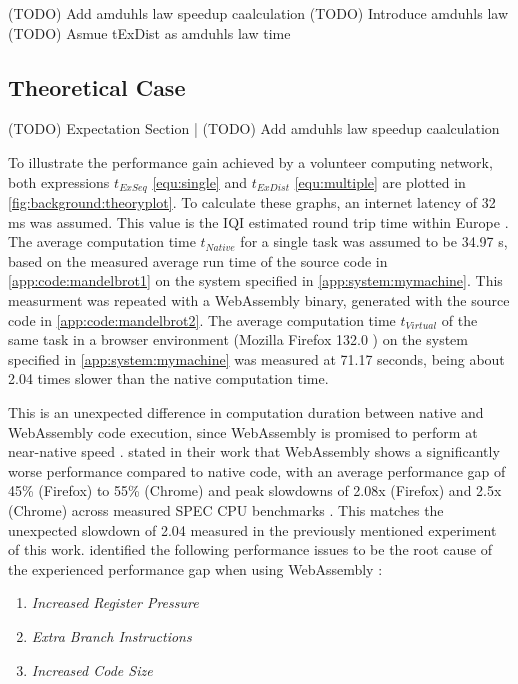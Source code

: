 (TODO) Add amduhls law speedup caalculation
(TODO) Introduce amduhls law
(TODO) Asmue tExDist as amduhls law time 

\subsection{Theoretical Case}
\label{subsec:concept:theroy_example}
(TODO) Expectation Section | (TODO) Add amduhls law speedup caalculation

To illustrate the performance gain achieved by a volunteer computing network, both expressions $t_{ExSeq}$ \eqref{equ:single} and $t_{ExDist}$ \eqref{equ:multiple} are plotted in \autoref{fig:background:theoryplot}. To calculate these graphs, an internet latency of 32 ms \cite{backend:latency} was assumed. This value is the \ac{IQI} estimated round trip time within Europe \cite{backend:latency}. The average computation time $t_{Native}$ for a single task was assumed to be 34.97 s, based on the measured average run time of the source code in \autoref{app:code:mandelbrot1} on the system specified in \autoref{app:system:mymachine}. This measurment was repeated with a WebAssembly binary, generated with the source code in \autoref{app:code:mandelbrot2}. The average computation time $t_{Virtual}$ of the same task in a browser environment (Mozilla Firefox 132.0 \cite{background:firefox}) on the system specified in \autoref{app:system:mymachine} was measured at 71.17 seconds, being about 2.04 times slower than the native computation time.
\newline
\begin{addmargin}[25pt]{25pt}
  This is an unexpected difference in computation duration between native and WebAssembly code execution, since WebAssembly is promised to perform at near-native speed \cite{methodology:wasm, methodology:wasmW3C}. \citeauthor{background:not-so-fast} stated in their work that WebAssembly shows a significantly worse performance compared to native code, with an average performance gap of 45\% (Firefox) to 55\% (Chrome) and peak slowdowns of 2.08x (Firefox) and 2.5x (Chrome) across measured SPEC \acs{CPU} benchmarks \cite{background:not-so-fast}. This matches the unexpected slowdown of 2.04 measured in the previously mentioned experiment of this work. \citeauthor{background:not-so-fast} identified the following performance issues to be the root cause of the experienced performance gap when using WebAssembly \cite{background:not-so-fast}:
  \begin{enumerate}
    \item \emph{Increased Register Pressure}
    \item \emph{Extra Branch Instructions}
    \item \emph{Increased Code Size}
  \end{enumerate}
\end{addmargin}
